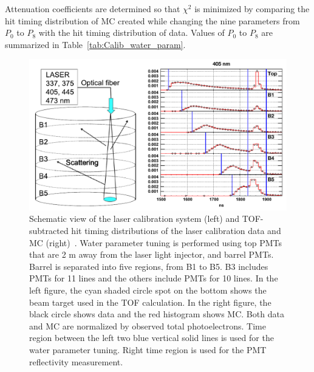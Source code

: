 Attenuation coefficients are determined so that $\chi^{2}$ is minimized by comparing the hit timing distribution of MC created while changing the nine parameters from $P_{0}$ to $P_{8}$ with the hit timing distribution of data.
Values of $P_{0}$ to $P_{8}$ are summarized in Table~\ref{tab:Calib_water_param}.

\begin{figure}[tbp]
	\centering
	\includegraphics[width=12cm]{Figures/Calibration/LaserCalib}
	\caption[Schematic view of the laser calibration system and TOF-subtracted hit timing distributions of the laser calibration data and MC]{
	Schematic view of the laser calibration system (left) and TOF-subtracted hit timing distributions of the laser calibration data and MC (right)~\cite{2014AbeCalib}.
	Water parameter tuning is performed using top PMTs that are 2 m away from the laser light injector, and barrel PMTs.
	Barrel is separated into five regions, from B1 to B5.
	B3 includes PMTs for 11 lines and the others include PMTs for 10 lines.
	In the left figure, the cyan shaded circle spot on the bottom shows the beam target used in the TOF calculation.
	In the right figure, the black circle shows data and the red histogram shows MC.
	Both data and MC are normalized by observed total photoelectrons.
	Time region between the left two blue vertical solid lines is used for the water parameter tuning.
	Right time region is used for the PMT reflectivity measurement.
	}\label{Calibration_LaserCalib}
\end{figure}

